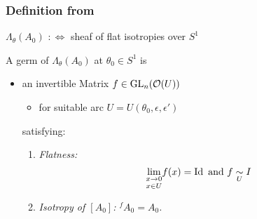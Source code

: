 \begin{comment}
  \begin{defn}[7.4]
    Let
    \begin{itemize}
      \item $k$ be a positive real number and
      \item $S$ be an open sector.
    \end{itemize}
    A function $f\in\cA(S)$, with asymptotic expansion
    $J(f)=\sum_{n\geq n_0}c_nz^n$, is said to bea a \emph{Grevrey function of
    order $k$} if:
    \\For every closed subsector $W$ of $S$ there are constants
    \begin{itemize}
      \item $A>0$ and
      \item $c>0$
    \end{itemize}
    such that for all
    \begin{itemize}
      \item $N\geq1$ and
      \item all $z\in W$ and $|z|\leq c$
    \end{itemize}
    one has
    \[
      \left| f(z)-\sum_{n_0\leq n\leq N-1}c_nz^n \right| \leq
      A^N \textcolor{green!40!black}{\Gamma\left(1+\frac{N}{k}\right)}|z|^N
    \]
    or equivalently
    \[
      \left| f(z)-\sum_{n_0\leq n\leq N-1}c_nz^n \right|
      \leq A^N \textcolor{green!40!black}{(N!)^{\frac{1}{k}}} |z|^N
    \]
  \end{defn}
\end{comment}

\subsubsection{Definition from \cite{Loday1994}}
$\Lambda_\theta(A_0)$ $:\Leftrightarrow{}$ sheaf of flat isotropies over $S^1$
\begin{defn}
  A germ of $\Lambda_\theta(A_0)$ at $\theta_0\in S^1$ is
  \begin{itemize}
    \item an invertible Matrix $f\in\operatorname{GL}_n(\mathcal{O}(U))$ 
      \begin{itemize}
        \item for suitable arc $U=U(\theta_0,\epsilon,\epsilon')$
      \end{itemize}
      satisfying:
      \begin{enumerate}
        \item \emph{Flatness:}
          \[
            \underset{x\in U}{\underset{x\to0}{\lim}}f(x)=\operatorname{Id}
            \text{ and }
            f\underset{U}{\sim}I
          \]
        \item \emph{Isotropy of $[A_0]$: ${}^fA_0=A_0$.}
      \end{enumerate}
  \end{itemize}
\end{defn}


